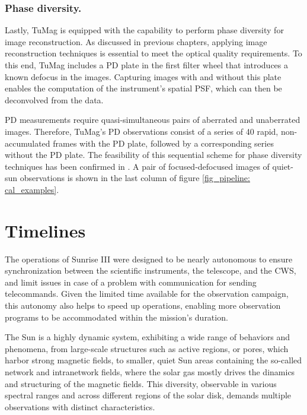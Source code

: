 \subsubsection{\label{susec: PD_measurements}Phase diversity.}

Lastly, TuMag is equipped with the capability to perform phase diversity for image reconstruction. As discussed in previous chapters, applying image reconstruction techniques is essential to meet the optical quality requirements. To this end, TuMag includes a PD plate in the first filter wheel that introduces a known defocus in the images. Capturing images with and without this plate enables the computation of the instrument's spatial PSF, which can then be deconvolved from the data.

PD measurements require quasi-simultaneous pairs of aberrated and unaberrated images. Therefore, TuMag's PD observations consist of a series of 40 rapid, non-accumulated frames with the PD plate, followed by a corresponding series without the PD plate. The feasibility of this sequential scheme for phase diversity techniques has been confirmed in \cite{PD_sequential}. A pair of focused-defocused images of quiet-sun observations is shown in the last column of figure \ref{fig_pipeline: cal_examples}.

\section{Timelines}

The operations of Sunrise III were designed to be nearly autonomous to ensure synchronization between the scientific instruments, the telescope, and the CWS, and limit issues in case of a problem with communication for sending telecommands. Given the limited time available for the observation campaign, this autonomy also helps to speed up operations, enabling more observation programs to be accommodated within the mission's duration.

The Sun is a highly dynamic system, exhibiting a wide range of behaviors and phenomena, from large-scale structures such as active regions, or pores, which harbor strong magnetic fields, to smaller, quiet Sun areas containing the so-called network and intranetwork fields, where the solar gas mostly drives the dinamics and structuring of the magnetic fields. This diversity, observable in various spectral ranges and across different regions of the solar disk, demands multiple observations with distinct characteristics.

